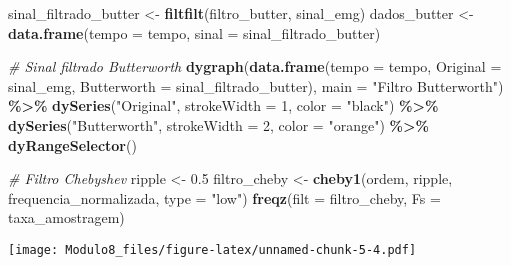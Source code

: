 \documentclass[
]{article}
\newenvironment{Shaded}{\begin{snugshade}}{\end{snugshade}}
\newcommand{\AttributeTok}[1]{\textcolor[rgb]{0.13,0.29,0.53}{#1}}
\newcommand{\CommentTok}[1]{\textcolor[rgb]{0.56,0.35,0.01}{\textit{#1}}}
\newcommand{\DecValTok}[1]{\textcolor[rgb]{0.00,0.00,0.81}{#1}}
\newcommand{\FloatTok}[1]{\textcolor[rgb]{0.00,0.00,0.81}{#1}}
\newcommand{\FunctionTok}[1]{\textcolor[rgb]{0.13,0.29,0.53}{\textbf{#1}}}
\newcommand{\NormalTok}[1]{#1}
\newcommand{\OtherTok}[1]{\textcolor[rgb]{0.56,0.35,0.01}{#1}}
\newcommand{\SpecialCharTok}[1]{\textcolor[rgb]{0.81,0.36,0.00}{\textbf{#1}}}
\newcommand{\StringTok}[1]{\textcolor[rgb]{0.31,0.60,0.02}{#1}}
\begin{document}
\begin{Shaded}
\begin{Highlighting}[]
\NormalTok{sinal\_filtrado\_butter }\OtherTok{\textless{}{-}} \FunctionTok{filtfilt}\NormalTok{(filtro\_butter, sinal\_emg)}
\NormalTok{dados\_butter }\OtherTok{\textless{}{-}} \FunctionTok{data.frame}\NormalTok{(}\AttributeTok{tempo =}\NormalTok{ tempo, }\AttributeTok{sinal =}\NormalTok{ sinal\_filtrado\_butter)}

\CommentTok{\# Sinal filtrado Butterworth}
\FunctionTok{dygraph}\NormalTok{(}\FunctionTok{data.frame}\NormalTok{(}\AttributeTok{tempo =}\NormalTok{ tempo, }\AttributeTok{Original =}\NormalTok{ sinal\_emg, }\AttributeTok{Butterworth =}\NormalTok{ sinal\_filtrado\_butter),}
        \AttributeTok{main =} \StringTok{"Filtro Butterworth"}\NormalTok{) }\SpecialCharTok{\%\textgreater{}\%}
  \FunctionTok{dySeries}\NormalTok{(}\StringTok{"Original"}\NormalTok{, }\AttributeTok{strokeWidth =} \DecValTok{1}\NormalTok{, }\AttributeTok{color =} \StringTok{"black"}\NormalTok{) }\SpecialCharTok{\%\textgreater{}\%}
  \FunctionTok{dySeries}\NormalTok{(}\StringTok{"Butterworth"}\NormalTok{, }\AttributeTok{strokeWidth =} \DecValTok{2}\NormalTok{, }\AttributeTok{color =} \StringTok{"orange"}\NormalTok{) }\SpecialCharTok{\%\textgreater{}\%}
  \FunctionTok{dyRangeSelector}\NormalTok{()}
\end{Highlighting}
\end{Shaded}

\begin{Shaded}
\begin{Highlighting}[]
\CommentTok{\# Filtro Chebyshev}
\NormalTok{ripple }\OtherTok{\textless{}{-}} \FloatTok{0.5}  
\NormalTok{filtro\_cheby }\OtherTok{\textless{}{-}} \FunctionTok{cheby1}\NormalTok{(ordem, ripple, frequencia\_normalizada, }\AttributeTok{type =} \StringTok{"low"}\NormalTok{)}
\FunctionTok{freqz}\NormalTok{(}\AttributeTok{filt =}\NormalTok{ filtro\_cheby, }\AttributeTok{Fs =}\NormalTok{ taxa\_amostragem)}
\end{Highlighting}
\end{Shaded}

\texttt{[image: Modulo8\_files/figure-latex/unnamed-chunk-5-4.pdf]}
\end{document}
